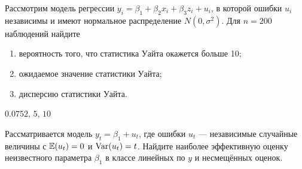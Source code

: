 \begin{problem}
Рассмотрим модель регрессии $y_i=\beta_1+\beta_2 x_i + \beta_3 z_i+u_i$, в которой
ошибки $u_i$ независимы и имеют нормальное распределение $N(0,\sigma^2)$. Для $n = 200$ наблюдений найдите
\begin{enumerate}
\item вероятность того, что статистика Уайта окажется больше 10;
\item ожидаемое значение статистики Уайта;
\item дисперсию статистики Уайта.
\end{enumerate}


\begin{sol}
$0.0752$, $5$, $10$
\end{sol}
\end{problem}


\begin{problem}
Рассматривается модель $y_t=\beta_1+u_t$, где ошибки $u_t$  — независимые
случайные величины с $\operatorname{\mathbb E}(u_t)=0$ и $\operatorname{Var}(u_t)=t$. Найдите наиболее эффективную
оценку неизвестного параметра $\beta_1$ в классе линейных по $y$ и несмещённых оценок.

\begin{sol}
\end{sol}
\end{problem}

